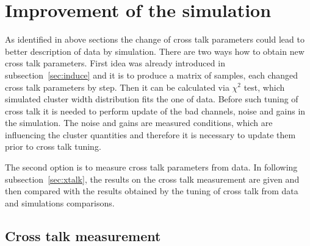 
\newpage

\section{Improvement of the simulation}

As identified in above sections the change of cross talk parameters could lead to better description of data by simulation. There are two ways how to obtain new cross talk parameters. First idea was already introduced in subsection~\ref{sec:induce} and it is to produce a matrix of samples, each changed cross talk parameters by step. Then it can be calculated via $\chi^{2}$ test, which simulated cluster width distribution fits the one of data. Before such tuning of cross talk it is needed to perform update of the bad channels, noise and gains in the simulation. The noise and gains are measured conditions, which are  influencing the cluster quantities and therefore it is necessary to update them prior to cross talk tuning.

The second option is to measure cross talk parameters from data. In following subsection~\ref{sec:xtalk}, the results on the cross talk measurement are given and then compared with the results obtained by the tuning of cross talk from data and simulations comparisons.



\subsection{Cross talk  measurement~\label{sec:xtalk}}


